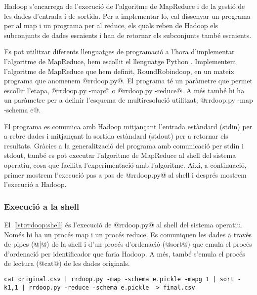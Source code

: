 Hadoop s'encarrega de l'execució de l'algoritme de MapReduce i de la
gestió de les dades d'entrada i de sortida.  Per a implementar-lo, cal
dissenyar un programa per al map i un programa per al reduce, els
quals reben de Hadoop els subconjunts de dades escaients i han de
retornar els subconjunts també escaients.  

Es pot utilitzar diferents llenguatges de programació a l'hora
d'implementar l'algoritme de MapReduce, hem escollit el llenguatge
Python \parencite{python:doc2}.  Implementem l'algoritme de MapReduce
que hem definit, RoundRobindoop, en un mateix programa que anomenem
@rrdoop.py@. El programa té un paràmetre que permet escollir l'etapa,
@rrdoop.py -map@ o @rrdoop.py -reduce@. A més també hi ha un paràmetre
per a definir l'esquema de multiresolució utilitzat, %
@rrdoop.py -map -schema e@.

El programa es comunica amb Hadoop mitjançant l'entrada estàndard
(stdin) per a rebre dades i mitjançant la sortida estàndard (stdout)
per a retornar els resultats.  Gràcies a la generalització del
programa amb comunicació per stdin i stdout, també es pot executar
l'algoritme de MapReduce al shell del sistema operatiu, cosa que
facilita l'experimentació amb l'algoritme.  Així, a continuació,
primer mostrem l'execució pas a pas de @rrdoop.py@ al shell i després
mostrem l'execució a Hadoop.



\subsubsection{Execució a la shell}

El~\autoref{lst:rrdoop:shell} és l'execució de
@rrdoop.py@ al shell del sistema operatiu. Només hi ha un procés map i
un procés reduce. Es comuniquen les dades a través de pipes (@|@) de la
shell i d'un procés d'ordenació (@sort@) que emula el procés
d'ordenació per identificador que faria Hadoop. A més, també s'emula
el procés de lectura (@cat@) de les dades originals.

\begin{lstlisting}[style=sh,caption=Execució a la shell de
  rrdoop.py,label=lst:rrdoop:shell]
cat original.csv | rrdoop.py -map -schema e.pickle -mapg 1 | sort -k1,1 | rrdoop.py -reduce -schema e.pickle  > final.csv
\end{lstlisting}


